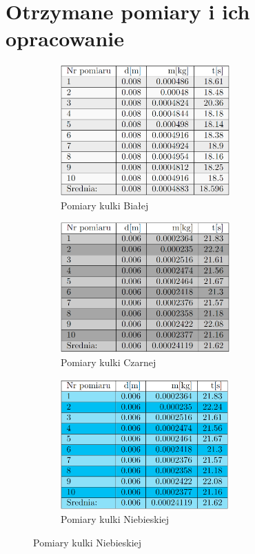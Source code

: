 \documentclass{article}
\begin{document}
\section{Otrzymane pomiary i ich opracowanie}

\begin{figure}[h]
 
    \begin{subfigure}{0.5\textwidth}
        \includegraphics[width=0.9\linewidth, height=5cm]{t_biala_pom.png} 
        \caption{Pomiary kulki Białej}
        \label{fig:subim1}
    \end{subfigure}
    \begin{subfigure}{0.5\textwidth}
        \includegraphics[width=0.9\linewidth, height=5cm]{t_czarna_pom.png}
        \caption{Pomiary kulki Czarnej}
        \label{fig:subim2}
    \end{subfigure}
    \begin{center}
        
        \begin{subfigure}{0.5\textwidth}
            \centering
        \includegraphics[width=0.9\linewidth, height=5cm]{t_niebieska_pom.png}
        \caption{Pomiary kulki Niebieskiej}
        \label{fig:subim2}
    \end{subfigure}
    \end{center}     
\end{figure}
\end{document}
